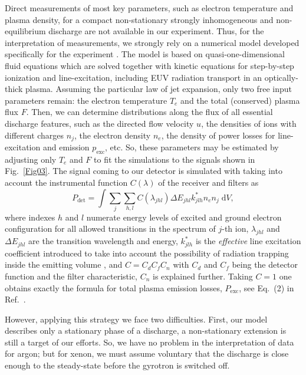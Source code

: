 \documentclass[aip, apl, amsmath,amssymb, reprint]{revtex4-1}
\begin{document}
Direct measurements of most key parameters, such as electron temperature and plasma density, for a compact non-stationary strongly inhomogeneous and non-equilibrium discharge are not available in our experiment. Thus, for the interpretation of measurements, we strongly rely on a numerical model developed specifically for the experiment \cite{abramov_pra_2018}. The model is based on quasi-one-dimensional fluid equations which are solved together with kinetic equations for step-by-step ionization and line-excitation, including EUV radiation transport in an optically-thick plasma. Assuming the particular law of jet expansion, only two free input parameters remain: the electron temperature $T_e$ and the total (conserved) plasma flux $F$. Then, we can determine distributions along the flux of all essential discharge features, such as the directed flow velocity $u$, the densities of ions with different charges $n_j$, the electron density $n_e$, the density of power losses for line-excitation and emission $p_\mathrm{exc}$, etc. 
So, these parameters may be estimated by adjusting only $T_e$ and $F$ to fit the simulations to the signals shown in Fig.~\ref{Fig03}. 
%
The signal coming to our detector is simulated with taking into account the instrumental function $C(\lambda)$ of the receiver and filters as
\begin{equation}\label{eq1}
P_{\mathrm{det}}=\int \sum_{j}\sum_{h,l} C(\lambda_{jhl}) \Delta E_{jhl} k_{jlh}^* n_e n_{j} \;\mathrm{d}V,
\end{equation}
where %
indexes $h$ and $l$ numerate energy levels of excited and ground electron configuration for all allowed transitions in the spectrum of $j$-th ion, $\lambda_{jhl}$ and $\Delta E_{jhl}$ are the transition wavelength and energy, $k_{jlh}^*$ is the \emph{effective} line excitation coefficient introduced to take into account the possibility of radiation trapping inside the emitting volume \cite{abramov_pra_2018}, and $C=C_d C_f C_n$ with $C_d$ and $C_f$ being the detector function and the filter characteristic, $C_n$ is explained further. Taking $C=1$ one obtains exactly the formula for total plasma emission losses, $P_{\mathrm{exc}}$, see Eq.~(2) in Ref.~.

However, applying this strategy we face two difficulties. First, our model describes only a stationary phase of a discharge, a non-stationary extension is still a target of our efforts. So, we have no problem in the interpretation of data for argon; but for xenon, we must assume voluntary that the discharge is close enough to the steady-state before the gyrotron is switched off. 
\end{document}
